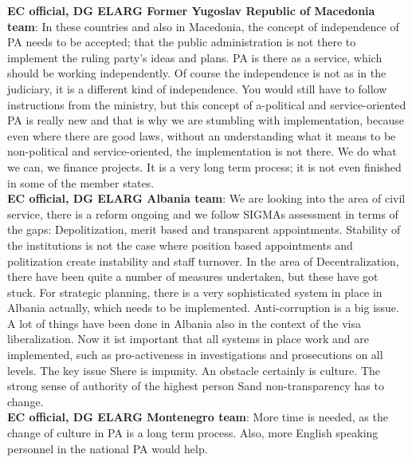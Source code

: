 \textbf{EC official, DG ELARG Former Yugoslav Republic of Macedonia team}: In these countries and also in Macedonia, the concept of independence of PA needs to be accepted; that the public administration is not there to implement the ruling party's ideas and plans. PA is there as a service, which should be working independently. Of course the independence is not as in the judiciary, it is a different kind of independence. You would still have to follow instructions from the ministry, but this concept of a-political and service-oriented PA is really new and that is why we are stumbling with implementation, because even where there are good laws, without an understanding what it means to be non-political and service-oriented, the implementation is not there. We do what we can, we finance projects. It is a very long term process; it is not even finished in some of the member states.\\ 
\textbf{EC official, DG ELARG Albania team}: We are looking into the area of civil service, there is a reform ongoing and we follow SIGMAs assessment in terms of the gaps: Depolitization, merit based and transparent appointments. Stability of the institutions is not the case where position based appointments and politization create instability and staff turnover. In the area of Decentralization, there have been quite a number of measures undertaken, but these have got stuck. For strategic planning, there is a very sophisticated system in place in Albania actually, which needs to be implemented. Anti-corruption is a big issue. A lot of things have been done in Albania also in the context of the visa liberalization. Now it ist important that all systems in place work and are implemented, such as pro-activeness in investigations and prosecutions on all levels. The key issue Shere is impunity. An obstacle certainly is culture. The strong sense of authority of the highest person Sand non-transparency has to change.\\
\textbf{EC official, DG ELARG Montenegro team}: More time is needed, as the change of culture in PA is a long term process. Also, more English speaking personnel in the national PA would help. \\
